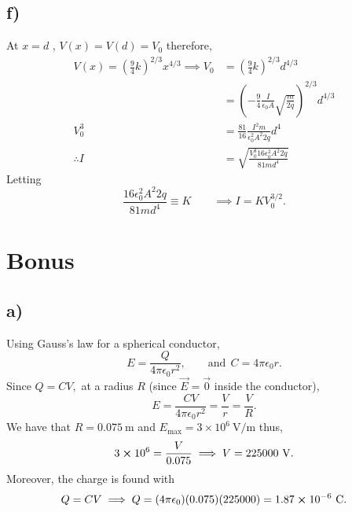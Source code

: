 \documentclass[
	12pt,
	]{article}
\newcommand{\ep}{\epsilon}
\theoremstyle{definition}
\theoremstyle{definition}
\theoremstyle{definition}
\theoremstyle{definition}
\theoremstyle{definition}
\theoremstyle{example}
\theoremstyle{note}
\theoremstyle{remark}
\theoremstyle{example}
\begin{document}
		 	\subsection*{f) }
		 	 	At $x=d$ , $V(x) = V(d) = V_{0}$ therefore, 
		 	 	\begin{align*}
		 	 		V(x) = \left(\frac{9}{4} k\right)^{2/3} x^{4/3} \implies V_{0} &= \left(\frac{9}{4} k\right)^{2/3} d^{4/3} \\
		 	 		&= \left(-\frac{9}{4} \frac{I}{\ep_{0}A} \sqrt{\frac{m}{2q}}\right)^{2/3} d^{4/3} \\
		 	 		V_{0}^{3} &= \frac{81}{16} \frac{I^{2} m }{\ep_{0}^{2} A^{2} 2q} d^{4} \\
		 	 		\therefore I &= \sqrt{\frac{V_{0}^{3}16\ep_{0}^{2} A^{2} 2q}{81 m d^{4}}} 
		 	 	\end{align*}
		 	 	Letting
		 	 	$$ \frac{16 \ep_{0}^{2}A^{2} 2q  }{81 m d^{4}} \equiv K \qquad \implies I = KV_{0}^{3/2}.$$
		 	\section*{Bonus }
		 		\subsection*{a) }
		 			Using Gauss's law for a spherical conductor, 
		 			$$ E = \frac{Q}{4 \pi \ep_{0}r^{2}}, \qquad \text{and} \ \ C = 4\pi \ep_{0}r.$$
		 			Since $Q = CV, $ at a radius $R$ (since $\vec{E} = \vec{0}$ inside the conductor), 
		 			$$ E = \frac{CV}{4 \pi \ep_{0} r^{2}} = \frac{V}{r} = \frac{V}{R}.$$
		 			We have that $R = 0.075 \ \si{\meter}$ and $E_{\text{max}} = 3\times 10^{6} \ \si{\volt\per\meter}$ thus,
		 			\begin{align*}
		 				3 \cross 10^{6} = \frac{V}{0.075} \implies V = 225 000 \ \si{\volt}.
		 			\end{align*}
		 			Moreover, the charge is found with 
		 			$$ Q = CV \implies Q = (4\pi \ep_{0})(0.075)(225 000) = 1.87 \cross 10^{-6} \ \si{\coulomb}.$$
\end{document}
